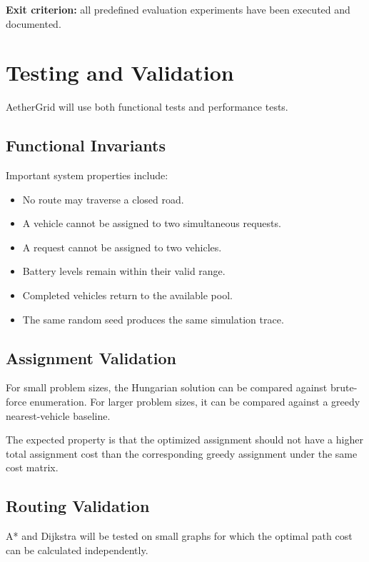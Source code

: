 \documentclass[12pt,a4paper]{article}
\begin{document}
\textbf{Exit criterion:} all predefined evaluation experiments have
been executed and documented.





\section{Testing and Validation}

AetherGrid will use both functional tests and performance tests.

\subsection{Functional Invariants}

Important system properties include:

\begin{itemize}
    \item No route may traverse a closed road.
    \item A vehicle cannot be assigned to two simultaneous requests.
    \item A request cannot be assigned to two vehicles.
    \item Battery levels remain within their valid range.
    \item Completed vehicles return to the available pool.
    \item The same random seed produces the same simulation trace.
\end{itemize}

\subsection{Assignment Validation}

For small problem sizes, the Hungarian solution can be compared
against brute-force enumeration. For larger problem sizes, it can
be compared against a greedy nearest-vehicle baseline.

The expected property is that the optimized assignment should not
have a higher total assignment cost than the corresponding greedy
assignment under the same cost matrix.

\subsection{Routing Validation}

A* and Dijkstra will be tested on small graphs for which the optimal
path cost can be calculated independently.
\end{document}
